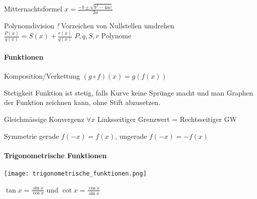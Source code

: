 
\begin{lemma}{Mitternachtsformel}
    $x=\frac{-b\pm\sqrt{b^2-4ac}}{2a}$
\end{lemma}

\begin{theorem}{Polynomdivision} \emph{!} Vorzeichen von Nullstellen umdrehen\\
    $\frac{P(x)}{q(x)} = S(x) + \frac{r(x)}{q(x)}$ \qquad $P,q,S,r$ Polynome
\end{theorem}


\raggedcolumns
\paragraph{Funktionen}
\small

\begin{definition}
    {Komposition/Verkettung} $(g \circ f)(x)=g(f(x))$
\end{definition}


\begin{definition}{Stetigkeit} \small
    Funktion ist stetig, falls Kurve keine Sprünge macht und man Graphen der Funktion zeichnen kann, ohne Stift abzusetzen.
\end{definition}

\begin{definition}{Gleichmässige Konvergenz}
    $\forall x$ Linksseitiger Grenzwert = Rechtsseitiger GW
\end{definition}

\begin{concept}{Symmetrie} gerade $f(-x)=f(x)$, ungerade $f(-x)=-f(x)$
\end{concept}

\paragraph{Trigonometrische Funktionen}
\texttt{[image: trigonometrische\_funktionen.png]}
\begin{remark}
    $\tan x = \frac{\sin x}{\cos x}$ und $\cot x = \frac{\cos x}{\sin x}$ 
\end{remark}

